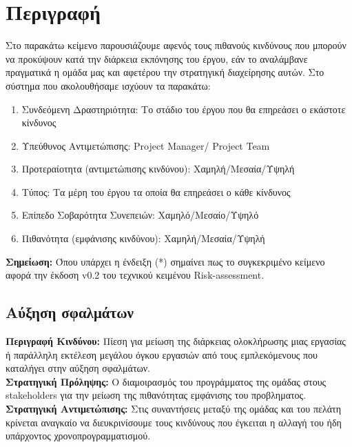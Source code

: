 \documentclass{article}
\begin{document}
\section{Περιγραφή}

Στο παρακάτω κείμενο παρουσιάζουμε αφενός τους πιθανούς κινδύνους που μπορούν να προκύψουν κατά την διάρκεια εκπόνησης του έργου, εάν το αναλάμβανε πραγματικά η ομάδα μας και αφετέρου την στρατηγική διαχείρησης αυτών. Στο σύστημα που ακολουθήσαμε ισχύουν τα παρακάτω:
\begin{enumerate}
    \item Συνδεόμενη Δραστηριότητα: Το στάδιο του έργου που θα επηρεάσει ο εκάστοτε κίνδυνος
    \item Υπεύθυνος Αντιμετώπισης: Project Manager/ Project Team
    \item Προτεραίοτητα (αντιμετώπισης κινδύνου): Χαμηλή/Μεσαία/Υψηλή
    \item Τύπος: Τα μέρη του έργου τα οποία θα επηρεάσει ο κάθε κίνδυνος
    \item Επίπεδο Σοβαρότητα Συνεπειών: Χαμηλό/Μεσαίο/Υψηλό
    \item Πιθανότητα (εμφάνισης κινδύνου): Χαμηλή/Μεσαία/Υψηλή
\end{enumerate}

\vspace{0.2cm}

\textbf{Σημείωση:} Όπου υπάρχει η ένδειξη (*) σημαίνει πως το συγκεκριμένο κείμενο αφορά την έκδοση v0.2 του τεχνικού κειμένου Risk-assessment.

\subsection{Αύξηση σφαλμάτων}

\textbf{Περιγραφή Κινδύνου:} Πίεση για μείωση της διάρκειας ολοκλήρωσης μιας εργασίας ή παράλληλη εκτέλεση  μεγάλου όγκου εργασιών από τους εμπλεκόμενους που καταλήγει στην αύξηση σφαλμάτων.\\

\textbf{Στρατηγική Πρόληψης:} Ο διαμοιρασμός του προγράμματος της ομάδας στους stakeholders για την μείωση της πιθανότητας εμφάνισης του προβληματος.\\

\textbf{Στρατηγική Αντιμετώπισης:} Στις συναντήσεις μεταξύ της ομάδας και του πελάτη κρίνεται αναγκαίο να διευκρινίσουμε τους κινδύνους που έγκειται η αλλαγή του ήδη υπάρχοντος χρονοπρογραμματισμού.\\
\end{document}
